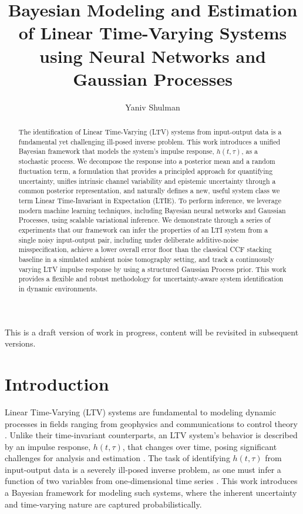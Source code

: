 \documentclass[preprint,1p,times,authoryear]{elsarticle}
\begin{document}
\begin{frontmatter}

\vspace*{\fill}
\begin{center}
This is a draft version of work in progress, content will be revisited in subsequent versions.
\end{center}
\vspace*{\fill}

\title{Bayesian Modeling and Estimation of Linear Time-Varying Systems using Neural Networks and Gaussian Processes}
\author{Yaniv Shulman}



\begin{abstract}
The identification of Linear Time-Varying (LTV) systems from input-output data is a fundamental yet challenging ill-posed inverse problem. This work introduces a unified Bayesian framework that models the system's impulse response, $h(t, \tau)$, as a stochastic process. We decompose the response into a posterior mean and a random fluctuation term, a formulation that provides a principled approach for quantifying uncertainty, unifies intrinsic channel variability and epistemic uncertainty through a common posterior representation, and naturally defines a new, useful system class we term Linear Time-Invariant in Expectation (LTIE). To perform inference, we leverage modern machine learning techniques, including Bayesian neural networks and Gaussian Processes, using scalable variational inference. We demonstrate through a series of experiments that our framework can infer the properties of an LTI system from a single noisy input-output pair, including under deliberate additive-noise misspecification, achieve a lower overall error floor than the classical CCF stacking baseline in a simulated ambient noise tomography setting, and track a continuously varying LTV impulse response by using a structured Gaussian Process prior. This work provides a flexible and robust methodology for uncertainty-aware system identification in dynamic environments.
\end{abstract}

\end{frontmatter}

\section{Introduction}
\label{s:Introduction}

Linear Time-Varying (LTV) systems are fundamental to modeling dynamic processes in fields ranging from geophysics and communications to control theory \citep{Kozachek2024, Lin2020, Bensen2007}. Unlike their time-invariant counterparts, an LTV system's behavior is described by an impulse response, $h(t, \tau)$, that changes over time, posing significant challenges for analysis and estimation \citep{Kailath1962, Bello1963}. The task of identifying $h(t, \tau)$ from input-output data is a severely ill-posed inverse problem, as one must infer a function of two variables from one-dimensional time series \citep{Aubel2015}. This work introduces a Bayesian framework for modeling such systems, where the inherent uncertainty and time-varying nature are captured probabilistically.
\end{document}
